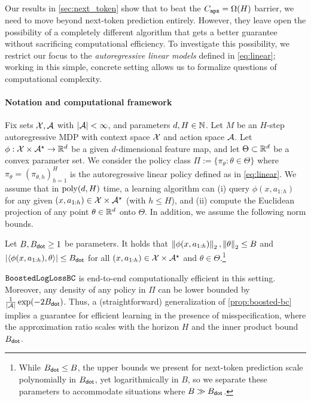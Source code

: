 Our results in \cref{sec:next_token} show that to beat the $C_{\texttt{apx}}=\Omega(H)$ barrier, we need to move beyond next-token prediction entirely. However, they leave open the possibility of a completely different algorithm that gets a better guarantee without sacrificing computational efficiency. To investigate this possibility, we restrict our focus to the \emph{autoregressive linear models} defined in \cref{eq:linear}; working in this simple, concrete setting allows us to formalize questions of computational complexity.

\paragraph{Notation and computational framework} Fix sets $\mathcal{X},\mathcal{A}$ with $|\mathcal{A}|<\infty$, and parameters $d,H\in\mathbb{N}$. Let $M$ be an $H$-step autoregressive MDP with context space $\mathcal{X}$ and action space $\mathcal{A}$. Let $\phi:\mathcal{X}\times\mathcal{A}^\star \to \mathbb{R}^d$ be a given $d$-dimensional feature map, and let $\Theta\subset\mathbb{R}^d$ be a convex parameter set. We consider the policy class $\Pi := \{\pi_\theta: \theta \in \Theta\}$ where $\pi_\theta = (\pi_{\theta,h})_{h=1}^H$ is the autoregressive linear policy defined as in \cref{eq:linear}. We assume that in $\mathrm{poly}(d,H)$ time, a learning algorithm can (i) query $\phi(x,a_{1:h})$ for any given $(x,a_{1:h}) \in \mathcal{X}\times\mathcal{A}^\star$ (with $h \leq H$), and (ii) compute the Euclidean projection of any point $\theta \in \mathbb{R}^d$ onto $\Theta$. In addition, we assume the
following norm bounds.

\begin{assumption}\label{ass:linear-norm-bounds-main}
  Let $B, B_{\mathsf{dot}} \geq{}1$ be parameters. It holds that $\left \lVert \phi(x,a_{1:h}) \right \rVert_2, \left \lVert \theta \right \rVert_2 \leq B$ and $|\langle \phi(x,a_{1:h}),\theta\rangle| \leq B_{\mathsf{dot}}$ for all $(x,a_{1:h}) \in \mathcal{X}\times\mathcal{A}^\star$ and $\theta\in\Theta$.\footnote{
    While $B_{\mathsf{dot}}\leq{}B$, the upper bounds we present for next-token prediction scale polynomially in $B_{\mathsf{dot}}$, yet logarithmically in $B$, so we separate these parameters to accommodate situations where $B\gg B_{\mathsf{dot}}$.
    }
\end{assumption}
$\texttt{BoostedLogLossBC}$ is end-to-end computationally efficient in this setting. Moreover, any density of any policy in $\Pi$ can be lower bounded by $\frac{1}{|\mathcal{A}|}\exp(-2B_{\mathsf{dot}})$. Thus, a (straightforward) generalization of \cref{prop:boosted-bc} implies a guarantee for efficient learning in the presence of misspecification, where the approximation ratio scales with the horizon $H$ and the inner product bound $B_{\mathsf{dot}}$.\loose

